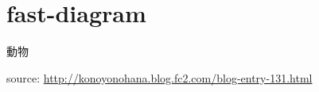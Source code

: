 \section{fast-diagram}
\begin{fast}{動物}
\end{fast}

source: \url{http://konoyonohana.blog.fc2.com/blog-entry-131.html}
